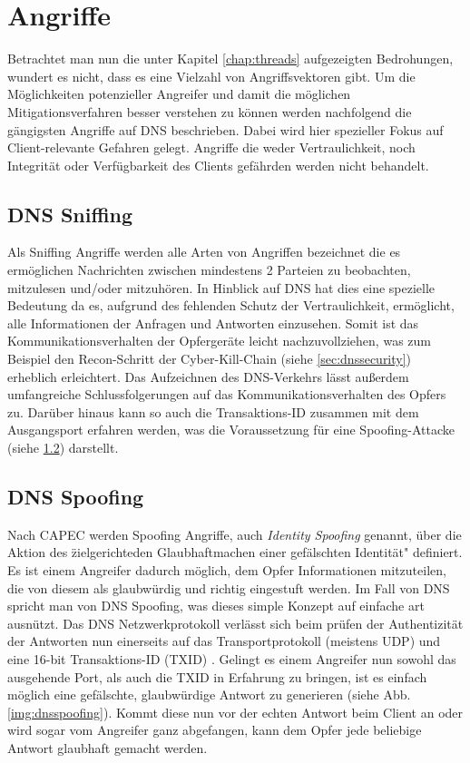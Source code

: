 \chapter{Angriffe}
\label{chap:attacks}

Betrachtet man nun die unter Kapitel \ref{chap:threads} aufgezeigten Bedrohungen, wundert es nicht, dass es eine Vielzahl von Angriffsvektoren gibt. Um die Möglichkeiten potenzieller Angreifer und damit die möglichen Mitigationsverfahren besser verstehen zu können werden nachfolgend die gängigsten Angriffe auf DNS beschrieben. Dabei wird hier spezieller Fokus auf Client-relevante Gefahren gelegt. Angriffe die weder Vertraulichkeit, noch Integrität oder Verfügbarkeit des Clients gefährden werden nicht behandelt.

\section{DNS Sniffing}
\label{sec:attacks-dnssniffing}

Als Sniffing Angriffe werden alle Arten von Angriffen bezeichnet die es ermöglichen Nachrichten zwischen mindestens 2 Parteien zu beobachten, mitzulesen und/oder mitzuhören\cite{CAPEC157}. In Hinblick auf DNS hat dies eine spezielle Bedeutung da es, aufgrund des fehlenden Schutz der Vertraulichkeit, ermöglicht, alle Informationen der Anfragen und Antworten einzusehen. Somit ist das Kommunikationsverhalten der Opfergeräte leicht nachzuvollziehen, was zum Beispiel den Recon-Schritt der Cyber-Kill-Chain (siehe \ref{sec:dnssecurity}) erheblich erleichtert. Das Aufzeichnen des DNS-Verkehrs lässt außerdem umfangreiche Schlussfolgerungen auf das Kommunikationsverhalten des Opfers zu. Darüber hinaus kann so auch die Transaktions-ID zusammen mit dem Ausgangsport erfahren werden, was die Voraussetzung für eine Spoofing-Attacke (siehe \ref{sec:attacks-dnsspoofing}) darstellt. 

\section{DNS Spoofing}
\label{sec:attacks-dnsspoofing}

Nach CAPEC werden Spoofing Angriffe, auch \textit{Identity Spoofing} genannt, über die Aktion des \"zielgerichteden Glaubhaftmachen einer gefälschten Identität" definiert. Es ist einem Angreifer dadurch möglich, dem Opfer Informationen mitzuteilen, die von diesem als glaubwürdig und richtig eingestuft werden. Im Fall von DNS spricht man von DNS Spoofing, was dieses simple Konzept auf einfache art ausnützt.
Das DNS Netzwerkprotokoll verlässt sich beim prüfen der Authentizität der Antworten nun einerseits auf das Transportprotokoll (meistens UDP) und eine 16-bit Transaktions-ID (TXID) \cite{rfc1035}. Gelingt es einem Angreifer nun sowohl das ausgehende Port, als auch die TXID in Erfahrung zu bringen, ist es einfach möglich eine gefälschte, glaubwürdige Antwort zu generieren (siehe Abb. \ref{img:dnsspoofing}). Kommt diese nun vor der echten Antwort beim Client an oder wird sogar vom Angreifer ganz abgefangen, kann dem Opfer jede beliebige Antwort glaubhaft gemacht werden.

